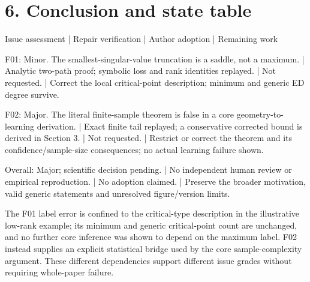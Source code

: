 \documentclass[10pt]{article}
\begin{document}
\section*{6. Conclusion and state table}
Issue assessment | Repair verification | Author adoption | Remaining work\par
F01: Minor. The smallest-singular-value truncation is a saddle, not a maximum. | Analytic two-path proof; symbolic loss and rank identities replayed. | Not requested. | Correct the local critical-point description; minimum and generic ED degree survive.\par
F02: Major. The literal finite-sample theorem is false in a core geometry-to-learning derivation. | Exact finite tail replayed; a conservative corrected bound is derived in Section 3. | Not requested. | Restrict or correct the theorem and its confidence/sample-size consequences; no actual learning failure shown.\par
Overall: Major; scientific decision pending. | No independent human review or empirical reproduction. | No adoption claimed. | Preserve the broader motivation, valid generic statements and unresolved figure/version limits.\par
The F01 label error is confined to the critical-type description in the illustrative low-rank example; its minimum and generic critical-point count are unchanged, and no further core inference was shown to depend on the maximum label. F02 instead supplies an explicit statistical bridge used by the core sample-complexity argument. These different dependencies support different issue grades without requiring whole-paper failure.\par
\end{document}
